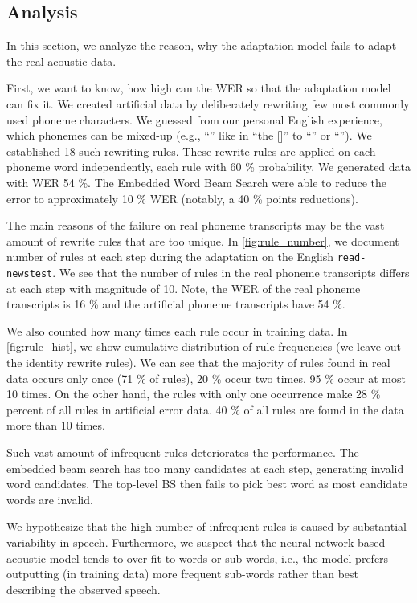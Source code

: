 \subsection{Analysis}
In this section, we analyze the reason, why the adaptation model fails to adapt the real acoustic data.

First, we want to know, how high can the WER so that the adaptation model can fix it. We created artificial data by deliberately rewriting few most commonly used phoneme characters. We guessed from our personal English experience, which phonemes can be mixed-up (e.g., ``'' like in ``the []'' to ``'' or ``''). We established 18 such rewriting rules. These rewrite rules are applied on each phoneme word independently, each rule with 60 \% probability.  We generated data with WER 54 \%. The Embedded Word Beam Search were able to reduce the error to approximately 10 \% WER (notably, a 40 \% points reductions).  

The main reasons of the failure on real phoneme transcripts may be the vast amount of rewrite rules that are too unique. In \cref{fig:rule_number}, we document number of rules at each step during the adaptation on the English \texttt{read-newstest}. We see that the number of rules in the real phoneme transcripts differs at each step with magnitude of 10. Note, the WER of the real phoneme transcripts is 16 \% and the artificial phoneme transcripts have 54 \%.

We also counted how many times each rule occur in training data. In \cref{fig:rule_hist}, we show cumulative distribution of rule frequencies (we leave out the identity rewrite rules). We can see that the majority of rules found in real data occurs only once (71 \% of rules), 20 \% occur two times, 95 \% occur at most 10 times. On the other hand, the rules with only one occurrence make 28 \% percent of all rules in artificial error data. 40 \% of all rules are found in the data more than 10 times.

Such vast amount of infrequent rules deteriorates the performance. The embedded beam search has too many candidates at each step, generating invalid word candidates. The top-level BS then fails to pick best word as most candidate words are invalid.

We hypothesize that the high number of infrequent rules is caused by substantial variability in speech. Furthermore, we suspect that the neural-network-based acoustic model tends to over-fit to words or sub-words, i.e., the model prefers outputting (in training data) more frequent sub-words rather than best describing the observed speech. 

